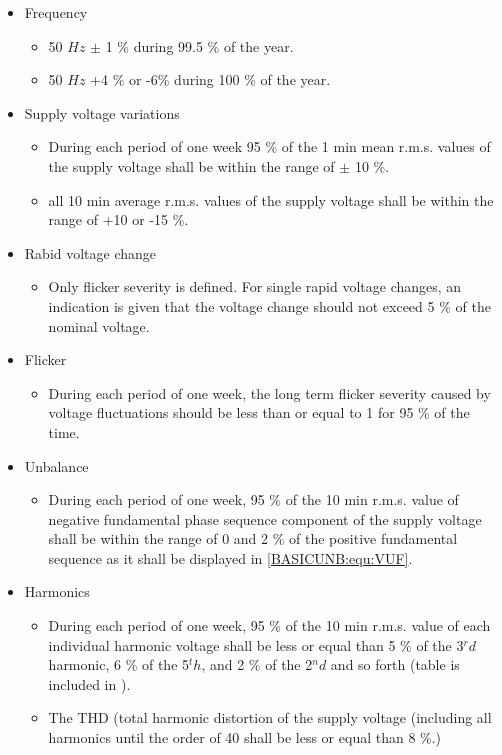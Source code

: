 \begin{itemize}
\item Frequency
    \begin{itemize}
    \item 50 $Hz$ $\pm$ 1 \% during 99.5 \% of the year.
    \item 50 $Hz$ +4 \% or -6\% during 100 \% of the year.
    \end{itemize}
\item Supply voltage variations
    \begin{itemize}
    \item During each period of one week 95 \% of the 1 min mean r.m.s. values of the supply voltage shall be within the range of $\pm$ 10 \%.
    \item all 10 min average r.m.s. values of the supply voltage shall be within the range of +10 or -15 \%.
    \end{itemize}
\item Rabid voltage change
    \begin{itemize}
    \item Only flicker severity is defined. For single rapid voltage changes, an indication is given that the voltage change should not exceed 5 \% of the nominal voltage.
    \end{itemize}
\item Flicker
    \begin{itemize}
    \item During each period of one week, the long term flicker severity caused by voltage fluctuations should be less than or equal to 1 for 95 \% of the time.
    \end{itemize}
\item Unbalance
    \begin{itemize}
    \item During each period of one week, 95 \% of the 10 min r.m.s. value of negative fundamental phase sequence component of the supply voltage shall be within the range of 0 and 2 \% of the positive fundamental sequence as it shall be displayed in \ref{BASICUNB:equ:VUF}.
    \end{itemize}
\item Harmonics
    \begin{itemize}
    \item During each period of one week, 95 \% of the 10 min r.m.s. value of each individual harmonic voltage shall be less or equal than 5 \% of the 3$^rd$ harmonic, 6 \% of the 5$^th$, and 2 \% of the 2$^nd$ and so forth (table is included in \cite{cobben2012power}).
    \item The THD (total harmonic distortion of the supply voltage (including all harmonics until the order of 40 shall be less or equal than 8 \%.)
    \end{itemize}
\end{itemize}


